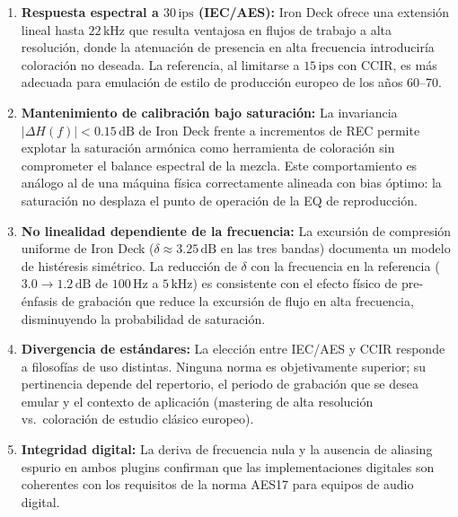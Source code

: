 \documentclass[10pt,conference]{IEEEtran}
\begin{document}
\begin{enumerate}
    \item \textbf{Respuesta espectral a $30\,\text{ips}$ (IEC/AES):} Iron Deck ofrece una
    extensión lineal hasta $22\,\text{kHz}$ que resulta ventajosa en flujos de trabajo a
    alta resolución, donde la atenuación de presencia en alta frecuencia introduciría
    coloración no deseada. La referencia, al limitarse a $15\,\text{ips}$ con CCIR, es
    más adecuada para emulación de estilo de producción europeo de los años 60--70.

    \item \textbf{Mantenimiento de calibración bajo saturación:} La invariancia $|\Delta H(f)|
    < 0.15\,\text{dB}$ de Iron Deck frente a incrementos de REC permite explotar la saturación
    armónica como herramienta de coloración sin comprometer el balance espectral de la mezcla.
    Este comportamiento es análogo al de una máquina física correctamente alineada con bias
    óptimo: la saturación no desplaza el punto de operación de la EQ de reproducción.

    \item \textbf{No linealidad dependiente de la frecuencia:} La excursión de compresión
    uniforme de Iron Deck ($\delta \approx 3.25\,\text{dB}$ en las tres bandas) documenta
    un modelo de histéresis simétrico. La reducción de $\delta$ con la frecuencia en la
    referencia ($3.0 \to 1.2\,\text{dB}$ de $100\,\text{Hz}$ a $5\,\text{kHz}$) es
    consistente con el efecto físico de pre-énfasis de grabación que reduce la excursión de
    flujo en alta frecuencia, disminuyendo la probabilidad de saturación.

    \item \textbf{Divergencia de estándares:} La elección entre IEC/AES y CCIR responde a
    filosofías de uso distintas. Ninguna norma es objetivamente superior; su pertinencia depende
    del repertorio, el periodo de grabación que se desea emular y el contexto de aplicación
    (mastering de alta resolución vs.\ coloración de estudio clásico europeo).

    \item \textbf{Integridad digital:} La deriva de frecuencia nula y la ausencia de aliasing
    espurio en ambos plugins confirman que las implementaciones digitales son coherentes con los
    requisitos de la norma AES17 \cite{aes17} para equipos de audio digital.
\end{enumerate}

\end{document}

